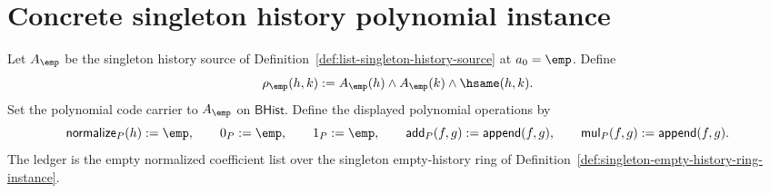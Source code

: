 \section{Concrete singleton history polynomial instance}
\label{sec:polynomial-concrete-singleton-history-instance}

\begin{definition}
\label{def:concrete-singleton-history-polynomial-instance}
Let $A_{\emp}$ be the singleton history source of
Definition~\ref{def:list-singleton-history-source} at $a_0=\emp$. Define
$$
\rho_{\emp}(h,k):=
A_{\emp}(h)\land A_{\emp}(k)\land\hsame(h,k).
$$
Set the polynomial code carrier to $A_{\emp}$ on $\mathsf{BHist}$. Define the
displayed polynomial operations by
$$
\mathsf{normalize}_P(h):=\emp,\qquad
0_P:=\emp,\qquad
1_P:=\emp,\qquad
\mathsf{add}_P(f,g):=\mathsf{append}(f,g),\qquad
\mathsf{mul}_P(f,g):=\mathsf{append}(f,g).
$$
The ledger is the empty normalized coefficient list over the singleton
empty-history ring of Definition~\ref{def:singleton-empty-history-ring-instance}.
\end{definition}

